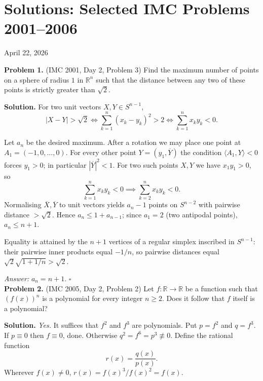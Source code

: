 \documentclass{article}
\newcommand{\R}{\mathbb{R}}
\begin{document}
\pagestyle{plain}

\section*{Solutions: Selected IMC Problems 2001--2006}

\begin{center}
April 22, 2026
\end{center}

\textbf{Problem 1.} (IMC 2001, Day 2, Problem 3)
Find the maximum number of points on a sphere of radius \( 1 \) in \( \R^n \) such that the distance between any two of these points is strictly greater than \( \sqrt{2} \).

\textbf{Solution.}
For two unit vectors \( X, Y \in S^{n-1} \),
\[
|X - Y| > \sqrt{2} \iff \sum_{k=1}^n (x_k - y_k)^2 > 2 \iff \sum_{k=1}^n x_k y_k < 0.
\]

Let \( a_n \) be the desired maximum. After a rotation we may place one point at \( A_1 = (-1, 0, \ldots, 0) \). For every other point \( Y = (y_1, \overline{Y}) \) the condition \( \langle A_1, Y \rangle < 0 \) forces \( y_1 > 0 \); in particular \( |\overline{Y}|^2 < 1 \). For two such points \( X, Y \) we have \( x_1 y_1 > 0 \), so
\[
\sum_{k=1}^n x_k y_k < 0 \implies \sum_{k=2}^n x_k y_k < 0.
\]
Normalising \( \overline{X}, \overline{Y} \) to unit vectors yields \( a_n - 1 \) points on \( S^{n-2} \) with pairwise distance \( > \sqrt{2} \). Hence \( a_n \leq 1 + a_{n-1} \); since \( a_1 = 2 \) (two antipodal points), \( a_n \leq n + 1 \).

Equality is attained by the \( n+1 \) vertices of a regular simplex inscribed in \( S^{n-1} \): their pairwise inner products equal \( -1/n \), so pairwise distances equal \( \sqrt{2}\sqrt{1 + 1/n} > \sqrt{2} \).

\textit{Answer:} \( a_n = n + 1 \). \hfill\(\square\)
\\

\textbf{Problem 2.} (IMC 2005, Day 2, Problem 2)
Let \( f : \R \to \R \) be a function such that \( (f(x))^n \) is a polynomial for every integer \( n \geq 2 \). Does it follow that \( f \) itself is a polynomial?

\textbf{Solution.}
\textit{Yes.} It suffices that \( f^2 \) and \( f^3 \) are polynomials. Put \( p = f^2 \) and \( q = f^3 \). If \( p \equiv 0 \) then \( f \equiv 0 \), done. Otherwise \( q^2 = f^6 = p^3 \not\equiv 0 \). Define the rational function
\[
r(x) = \frac{q(x)}{p(x)}.
\]
Wherever \( f(x) \neq 0 \), \( r(x) = f(x)^3 / f(x)^2 = f(x) \).
\end{document}
